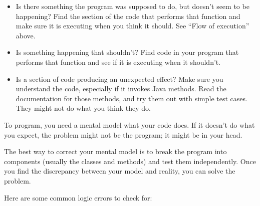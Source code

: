 \documentclass[12pt]{book}
\theoremstyle{exercise}
\begin{document}
\begin{itemize}

\item Is there something the program was supposed to do, but
doesn't seem to be happening?  Find the section of the code
that performs that function and make sure it is executing when
you think it should.  See ``Flow of execution'' above.

\item Is something happening that shouldn't?  Find code in
your program that performs that function and see if it is
executing when it shouldn't.

\item Is a section of code producing an unexpected effect?  Make sure
  you understand the code, especially if it invokes
  Java methods.  Read the documentation for those methods, and
  try them out with simple test cases.  They might not do what you
  think they do.

\end{itemize}

To program, you need a mental model what your code does.
If it doesn't do what you expect, the problem might not be
the program; it might be in your head.

The best way to correct your mental model is to break the program
into components (usually the classes and methods) and test
them independently.  Once you find the discrepancy
between your model and reality, you can solve the problem.

Here are some common logic errors to check for:
\end{document}
